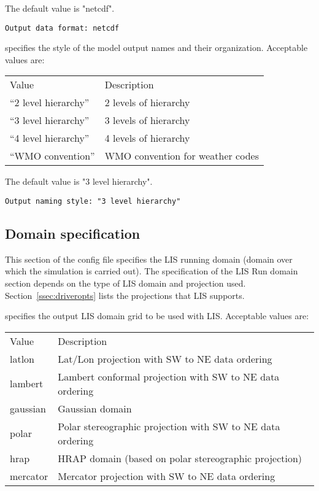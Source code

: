  The default value is "netcdf".
 

 \begin{Verbatim}[frame=single]
Output data format: netcdf
 \end{Verbatim}

 
  specifies the style of the model output
 names and their organization.
 Acceptable values are:

 \begin{tabular}{ll}
 Value                 & Description                       \\
 ``2 level hierarchy'' & 2 levels of hierarchy             \\
 ``3 level hierarchy'' & 3 levels of hierarchy             \\
 ``4 level hierarchy'' & 4 levels of hierarchy             \\
 ``WMO convention''    & WMO convention for weather codes  \\
 \end{tabular}

 The default value is "3 level hierarchy".
 

 \begin{Verbatim}[frame=single]
Output naming style: "3 level hierarchy"
 \end{Verbatim}

 
 \subsection{Domain specification} \label{ssec:domainspec}
 This section of the config file specifies the LIS running domain
 (domain over which the simulation is carried out).
 The specification of the LIS Run domain section depends on the type of
 LIS domain and projection used.
 Section~\ref{ssec:driveropts} lists the projections that LIS supports.
 

 
  specifies the output 
 LIS domain grid to be used with LIS.
 Acceptable values are:

 \begin{tabular}{ll}
 Value    & Description                                              \\
 latlon   & Lat/Lon projection with SW to NE data ordering           \\
 lambert  & Lambert conformal projection with SW to NE data ordering \\
 gaussian & Gaussian domain                                          \\
 polar    & Polar stereographic projection with SW to NE data
            ordering                                                 \\
 hrap     & HRAP domain (based on polar stereographic projection)    \\
 mercator & Mercator projection with SW to NE data ordering          \\
 \end{tabular}
 

